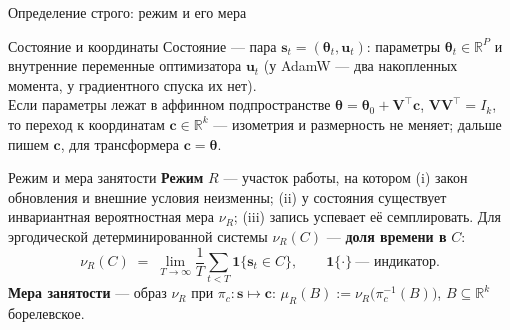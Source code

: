 \documentclass[aspectratio=169, 11pt]{beamer}
\newcommand{\R}{\mathbb{R}}
\newcommand{\vc}{\mathbf{c}}
\newcommand{\vs}{\mathbf{s}}
\newcommand{\vu}{\mathbf{u}}
\newcommand{\vtheta}{\boldsymbol{\theta}}
\newcommand{\mV}{\mathbf{V}}
\begin{document}
\begin{frame}{Определение строго: режим и его мера}
    \begin{block}{Состояние и координаты}
        \small
        Состояние --- пара $\vs_t = (\vtheta_t, \vu_t)$: параметры
        $\vtheta_t \in \R^P$ и внутренние переменные оптимизатора $\vu_t$ (у
        AdamW --- два накопленных момента, у градиентного спуска их нет).
        \\[0.7mm]
        Если параметры лежат в аффинном подпространстве
        $\vtheta = \vtheta_0 + \mV^{\!\top}\vc$, $\mV\mV^{\!\top} = I_k$, то
        переход к координатам $\vc \in \R^k$ --- изометрия и размерность не
        меняет; дальше пишем $\vc$, для трансформера $\vc = \vtheta$.
    \end{block}

    \begin{block}{Режим и мера занятости}
        \small
        \textbf{Режим} $R$ --- участок работы, на котором (i) закон обновления и
        внешние условия неизменны; (ii) у состояния существует инвариантная
        вероятностная мера $\nu_R$; (iii) запись успевает её семплировать. Для
        эргодической детерминированной системы $\nu_R(C)$ --- \textbf{доля
        времени в} $C$:
        \[
          \nu_R(C) \;=\; \lim_{T \to \infty} \frac1T
          \sum_{t < T} \mathbf 1\{\vs_t \in C\},
          \qquad \mathbf 1\{\cdot\} \ \text{--- индикатор.}
        \]
        \textbf{Мера занятости} --- образ $\nu_R$ при $\pi_c : \vs \mapsto \vc$:
        $\mu_R(B) := \nu_R\bigl(\pi_c^{-1}(B)\bigr)$, $B \subseteq \R^k$
        борелевское.
    \end{block}
\end{frame}
\end{document}
